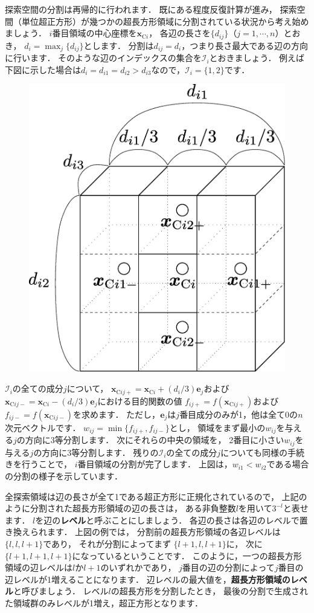 ﻿\documentclass{jsarticle}
\begin{document}
探索空間の分割は再帰的に行われます．
既にある程度反復計算が進み，
探索空間（単位超正方形）が幾つかの超長方形領域に分割されている状況から考え始めましょう．
$i$番目領域の中心座標を$\bm{x}_{\mathrm{C}i}$，
各辺の長さを$\{d_{ij}\}$（$j=1,\cdots,n$）とおき，
$d_{i}=\max_{j}\{d_{ij}\}$とします．
分割は$d_{ij}=d_{i}$，つまり長さ最大である辺の方向に行います．
そのような辺のインデックスの集合を$\mathcal{I}_{i}$とおきましょう．
例えば下図に示した場合は$d_{i}=d_{i1}=d_{i2}>d_{i3}$なので，$\mathcal{I}_{i}=\{1,2\}$です．

\begin{figure}[h]
\begin{center}
\includegraphics[width=.4\textwidth]{fig/DIRECT_divide.eps}
\end{center}
\end{figure}

$\mathcal{I}_{i}$の全ての成分$j$について，
$\bm{x}_{\mathrm{C}ij+}=\bm{x}_{\mathrm{C}i}+(d_{i}/3)\bm{e}_{j}$および
$\bm{x}_{\mathrm{C}ij-}=\bm{x}_{\mathrm{C}i}-(d_{i}/3)\bm{e}_{j}$における目的関数の値
$f_{ij+}=f(\bm{x}_{\mathrm{C}ij+})$および$f_{ij-}=f(\bm{x}_{\mathrm{C}ij-})$を求めます．
ただし，$\bm{e}_{j}$は$j$番目成分のみが1，他は全て0の$n$次元ベクトルです．
$w_{ij}=\min\{f_{ij+},f_{ij-}\}$とし，
領域をまず最小の$w_{ij}$を与える$j$の方向に3等分割します．
次にそれらの中央の領域を，
2番目に小さい$w_{ij}$を与える$j$の方向に3等分割します．
残りの$\mathcal{I}_{i}$の全ての成分$j$についても同様の手続きを行うことで，
$i$番目領域の分割が完了します．
上図は，$w_{i1}<w_{i2}$である場合の分割の様子を示しています．

全探索領域は辺の長さが全て1である超正方形に正規化されているので，
上記のように分割された超長方形領域の辺の長さは，
ある非負整数$l$を用いて$3^{-l}$と表せます．
$l$を辺の{\bf レベル}と呼ぶことにしましょう．
各辺の長さは各辺のレベルで置き換えられます．
上図の例では，
分割前の超長方形領域の各辺レベルは$\{l,l,l+1\}$であり，
それが分割によってまず
$\{l+1,l,l+1\}$に，
次に$\{l+1,l+1,l+1\}$になっているということです．
このように，一つの超長方形領域の辺レベルは$l$か$l+1$のいずれかであり，
$j$番目の辺の分割によって$j$番目の辺レベルが1増えることになります．
辺レベルの最大値を，{\bf 超長方形領域のレベル}と呼びましょう．
レベル$l$の超長方形を分割したとき，
最後の分割で生成された領域群のみレベルが1増え，超正方形となります．
\end{document}
